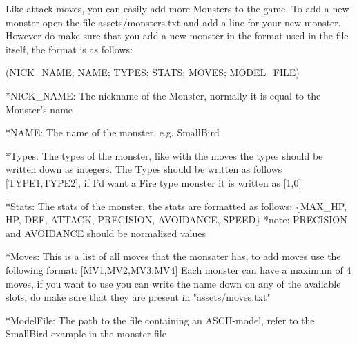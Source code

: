 Like attack moves, you can easily add more Monsters to the game. To add a new monster open the file {\ttfamily assets/monsters.\+txt} and add a line for your new monster. However do make sure that you add a new monster in the format used in the file itself, the format is as follows\+: 
\begin{DoxyCode}
(NICK\_NAME; NAME; TYPES; STATS; MOVES; MODEL\_FILE)


*NICK\_NAME: The nickname of the Monster, normally it is equal to the Monster's name

*NAME: The name of the monster, e.g. SmallBird

*Types: The types of the monster, like with the moves the types should be written down as integers. The
       Types should be written as follows [TYPE1,TYPE2], if I'd want a Fire type monster it is written as [1,0]

*Stats: The stats of the monster, the stats are formatted as follows:
  \{MAX\_HP, HP, DEF, ATTACK, PRECISION, AVOIDANCE, SPEED\}
  *note: PRECISION and AVOIDANCE should be normalized values

*Moves: This is a list of all moves that the monsater has, to add moves use the following format:
  [MV1,MV2,MV3,MV4]
  Each monster can have a maximum of 4 moves, if you want to use you can write the name down on any of the
       available slots, do make sure that they are present in "assets/moves.txt"

*ModelFile: The path to the file containing an ASCII-model, refer to the SmallBird example in the monster
       file
\end{DoxyCode}
 